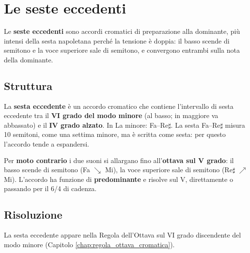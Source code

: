 \chapter{Le seste eccedenti}
\label{chap:seste_eccedenti}

Le \textbf{seste eccedenti} sono accordi cromatici di preparazione alla dominante, più intensi della sesta napoletana perché la tensione è doppia: il basso scende di semitono e la voce superiore sale di semitono, e convergono entrambi sulla nota della dominante.

\section{Struttura}
\label{sec:struttura_seste}

\begin{definizione}
	\label{def:sesta_eccedente_cap}
	La \textbf{sesta eccedente} è un accordo cromatico che contiene l'intervallo di sesta eccedente tra il \textbf{VI grado del modo minore} (al basso; in maggiore va abbassato) e il \textbf{IV grado alzato}. In La minore: Fa--Re$\sharp$. La sesta Fa--Re$\sharp$ misura 10 semitoni, come una settima minore, ma è scritta come sesta: per questo l'accordo tende a espandersi.
\end{definizione}

Per \textbf{moto contrario} i due suoni si allargano fino all'\textbf{ottava sul V grado}: il basso scende di semitono (Fa $\searrow$ Mi), la voce superiore sale di semitono (Re$\sharp$ $\nearrow$ Mi). L'accordo ha funzione di \textbf{predominante} e risolve sul V, direttamente o passando per il 6/4 di cadenza.

\section{Risoluzione}
\label{sec:risoluzione_seste}

La sesta eccedente appare nella Regola dell'Ottava sul VI grado discendente del modo minore (Capitolo \ref{chap:regola_ottava_cromatica}).

